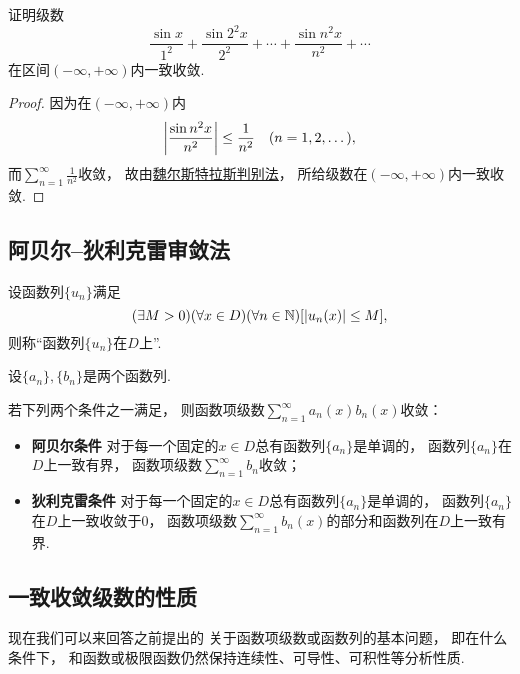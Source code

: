 \begin{example}
证明级数\[
	\frac{\sin x}{1^2}
	+ \frac{\sin 2^2 x}{2^2}
	+ \dotsb
	+ \frac{\sin n^2 x}{n^2}
	+ \dotsb
\]在区间\((-\infty,+\infty)\)内一致收敛.
\begin{proof}
因为在\((-\infty,+\infty)\)内\[
	\abs{\frac{\sin n^2 x}{n^2}} \leq \frac{1}{n^2}
	\quad(n=1,2,\dotsc),
\]
而\(\sum_{n=1}^\infty \frac{1}{n^2}\)收敛，
故由\hyperref[theorem:无穷级数.魏尔斯特拉斯判别法]{魏尔斯特拉斯判别法}，
所给级数在\((-\infty,+\infty)\)内一致收敛.
\end{proof}
\end{example}

\subsection{阿贝尔--狄利克雷审敛法}
\begin{definition}\label{definition:函数项级数.函数列的一致有界性}
设函数列\(\{u_n\}\)满足\[
	(\exists M>0)
	(\forall x \in D)
	(\forall n\in\mathbb{N})
	[\abs{u_n(x)} \leq M],
\]
则称“函数列\(\{u_n\}\)在\(D\)上”.
\end{definition}

\begin{theorem}\label{theorem:函数项级数.函数项级数的阿贝尔--狄利克雷审敛法}
设\(\{a_n\},\{b_n\}\)是两个函数列.

若下列两个条件之一满足，
则函数项级数\(\sum_{n=1}^\infty a_n(x) b_n(x)\)收敛：\begin{itemize}
	\item {\rm\bf 阿贝尔条件}
	对于每一个固定的\(x \in D\)总有函数列\(\{a_n\}\)是单调的，
	函数列\(\{a_n\}\)在\(D\)上一致有界，
	函数项级数\(\sum_{n=1}^\infty b_n\)收敛；

	\item {\rm\bf 狄利克雷条件}
	对于每一个固定的\(x \in D\)总有函数列\(\{a_n\}\)是单调的，
	函数列\(\{a_n\}\)在\(D\)上一致收敛于\(0\)，
	函数项级数\(\sum_{n=1}^\infty b_n(x)\)的部分和函数列在\(D\)上一致有界.
\end{itemize}
\end{theorem}

\subsection{一致收敛级数的性质}
现在我们可以来回答之前提出的
关于函数项级数或函数列的基本问题，
即在什么条件下，
和函数或极限函数仍然保持连续性、可导性、可积性等分析性质.

